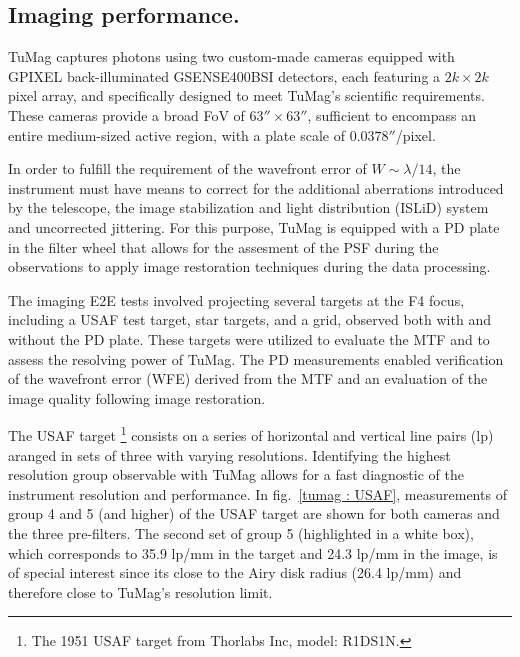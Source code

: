\subsection{Imaging performance.}
TuMag captures photons using two custom-made cameras \citep{tumag-cams} equipped with GPIXEL back-illuminated GSENSE400BSI detectors, each featuring a $2k \times 2k$ pixel array, and specifically designed to meet TuMag's scientific requirements. These cameras provide a broad FoV of $63'' \times 63''$, sufficient to encompass an entire medium-sized active region, with a plate scale of $0.0378''$/pixel.

In order to fulfill the requirement of the wavefront error of $W \sim \lambda / 14$, the instrument must have means to correct for the additional aberrations introduced by the telescope, the image stabilization and light distribution (ISLiD) system and uncorrected jittering. For this purpose, TuMag is equipped with a PD plate in the filter wheel that allows for the assesment of the PSF during the observations to apply image restoration techniques during the data processing.  

The imaging E2E tests involved projecting several targets at the F4 focus, including a USAF test target, star targets, and a grid, observed both with and without the PD plate. These targets were utilized to evaluate the MTF and to assess the resolving power of TuMag. The PD measurements enabled verification of the wavefront error (WFE) derived from the MTF and an evaluation of the image quality following image restoration. 

The USAF target \footnote{The 1951 USAF target from Thorlabs Inc, model: R1DS1N.} consists on a series of horizontal and vertical line pairs (lp) aranged in sets of three with varying resolutions. Identifying the highest resolution group observable with TuMag allows for a fast diagnostic of the instrument resolution and performance. In fig.~\ref{tumag : USAF}, measurements of group 4 and 5 (and higher) of the USAF target are shown for both cameras and the three pre-filters. The second set of group 5 (highlighted in a white box), which corresponds to 35.9 lp/mm in the target and 24.3 lp/mm in the image, is of special interest since its close to the Airy disk radius (26.4 lp/mm) and therefore close to TuMag's resolution limit. 

